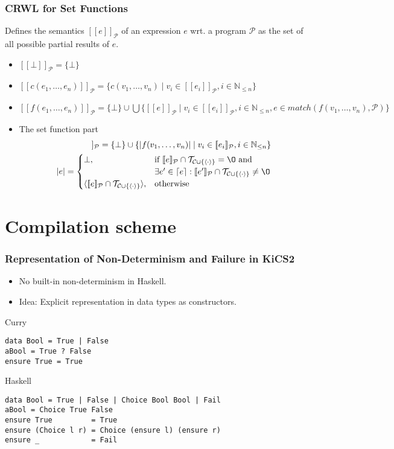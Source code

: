 \documentclass[utf8]{beamer}
\newcommand{\prog}{\mathcal{P}}
\newcommand{\cons}{\mathcal{C}}
\newcommand{\term}[1]{\mathcal{T}_{#1}}
\newcommand{\sem}[1]{[\![#1]\!]_\prog} %
\newcommand{\enc}[1]{|#1|} %
\newcommand{\encc}[1]{\langle #1 \rangle} %
\newcommand{\up}[1]{\lceil #1 \rceil} %
\newcommand{\nats}{\mathbb{N}} %
\begin{document}
\begin{frame}
\frametitle{CRWL for Set Functions}

Defines the semantics $\sem{e}$ of an expression $e$ wrt. a program $\prog$ as
the set of all possible partial results of $e$.

\begin{itemize}
\item<1-> $\sem{\bot} = \{\bot\}$
\item<1,3-> $\sem{c(e_1,\ldots, e_n)} = \{c(v_1,\ldots, v_n) \mid v_i \in \sem{e_i}, i \in \nats_{\le n}\}$
\item<1,4->  $\sem{f(e_1,\ldots,e_n)} =\{\bot\} \cup \bigcup\{\sem{e}\mid v_i \in \sem{e_i}, i \in \nats_{\le n}, e \in match(f(v_1,\ldots,v_n),\prog)\}$
\item<1,5-> The set function part 
\begin{align*} 
\sem{f_s(e_1,\ldots, e_n)} = \{\bot\}\cup \{\enc{f(v_1,\ldots, v_n)} \mid  v_i \in \sem{e_i}, i \in \nats_{\le n}\}\\
\enc{e} = \begin{cases}
             \bot, & \mbox{if } \sem{e} \cap \term{\cons \cup \{\encc{\cdot}\}} = \O \mbox{ and } \\
                   & \exists e' \in \up{e} : \sem{e'} \cap \term{\cons \cup \{\encc{\cdot}\}} \not = \O\\
             \encc{\sem{e} \cap \term{\cons \cup \{\encc{\cdot}\}}}, & \mbox{otherwise}
               \end{cases}
\end{align*}
\end{itemize}
\end{frame}

\section{Compilation scheme}

\begin{frame}[fragile]
\frametitle{Representation of Non-Determinism and Failure in KiCS2}
\begin{itemize}
  \item No built-in non-determinism in Haskell.
  \item Idea: Explicit representation in data types as constructors.
\end{itemize}
\pause
\begin{block}{Curry}
\begin{lstlisting}
data Bool = True | False
aBool = True ? False
ensure True = True
\end{lstlisting}
\end{block}

\begin{block}{Haskell}
\begin{lstlisting}
data Bool = True | False | Choice Bool Bool | Fail
aBool = Choice True False
ensure True         = True
ensure (Choice l r) = Choice (ensure l) (ensure r)
ensure _            = Fail
\end{lstlisting}
\end{block}
\end{frame}
\end{document}
